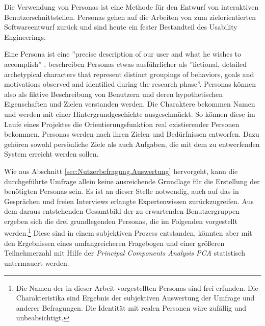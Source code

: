 Die Verwendung von Personas ist eine Methode für den Entwurf von interaktiven Benutzerschnittstellen. Personas gehen auf die Arbeiten von \cite{cooper1999inmates} zum zielorientierten Softwareentwurf zurück und sind heute ein fester Bestandteil des Usability Engineerings. 

Eine Persona ist eine ''precise description of our user and what he wishes to accomplish'' \citep[S. 123]{cooper1999inmates}. \cite{calde2002} beschreiben Personas etwas ausführlicher als ''fictional, detailed archetypical characters that represent distinct groupings of behaviors, goals and motivations observed and identified during the research phase''. Personas können also als fiktive Beschreibung von Benutzern und deren hypothetischen Eigenschaften und Zielen verstanden werden. Die Charaktere bekommen Namen und werden mit einer Hintergrundgeschichte ausgeschmückt. So können diese im Laufe eines Projektes die Orientierungsfunktion real existierender Personen bekommen. Personas werden nach ihren Zielen und Bedürfnissen entworfen. Dazu gehören sowohl persönliche Ziele als auch Aufgaben, die mit dem zu entwerfenden System erreicht werden sollen. 

Wie aus Abschnitt \ref{sec:Nutzerbefragung.Auswertung} hervorgeht, kann die durchgeführte Umfrage allein keine ausreichende Grundlage für die Erstellung der benötigten Personas sein. Es ist an dieser Stelle notwendig, auch auf das in Gesprächen und freien Interviews erlangte Expertenwissen zurückzugreifen. Aus dem daraus entstehenden Gesamtbild der zu erwartenden Benutzergruppen ergeben sich die drei grundlegenden Personas, die im Folgenden vorgestellt werden.\footnote{Die Namen der in dieser Arbeit vorgestellten Personas sind frei erfunden. Die Charakteristika sind Ergebnis der subjektiven Auswertung der Umfrage und anderer Befragungen. Die Identität mit realen Personen wäre zufällig und unbeabsichtigt.} Diese sind in einem subjektiven Prozess entstanden, könnten aber mit den Ergebnissen eines umfangreicheren Fragebogen und einer größeren Teilnehmerzahl mit Hilfe der \emph{Principal Components Analysis PCA} \citep[ein frühes Beispiel geben][]{jolicoeur1960pca} statistisch untermauert werden.

